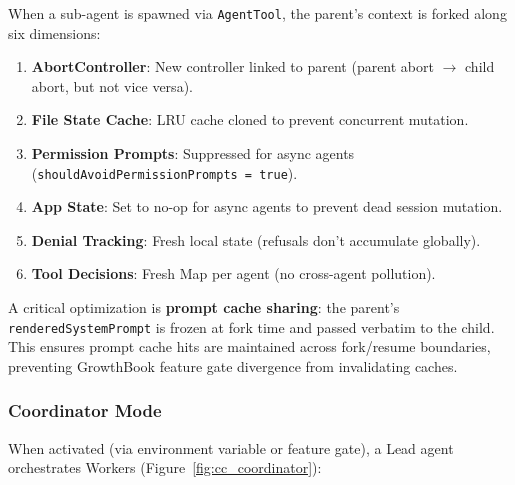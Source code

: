 \documentclass[11pt,a4paper]{article}
\begin{document}
When a sub-agent is spawned via \texttt{AgentTool}, the parent's context is forked along six dimensions:

\begin{enumerate}[itemsep=1pt]
  \item \textbf{AbortController}: New controller linked to parent (parent abort $\to$ child abort, but not vice versa).
  \item \textbf{File State Cache}: LRU cache cloned to prevent concurrent mutation.
  \item \textbf{Permission Prompts}: Suppressed for async agents (\texttt{shouldAvoidPermissionPrompts = true}).
  \item \textbf{App State}: Set to no-op for async agents to prevent dead session mutation.
  \item \textbf{Denial Tracking}: Fresh local state (refusals don't accumulate globally).
  \item \textbf{Tool Decisions}: Fresh Map per agent (no cross-agent pollution).
\end{enumerate}

A critical optimization is \textbf{prompt cache sharing}: the parent's \texttt{renderedSystemPrompt} is frozen at fork time and passed verbatim to the child.
This ensures prompt cache hits are maintained across fork/resume boundaries, preventing GrowthBook feature gate divergence from invalidating caches.

\subsubsection{Coordinator Mode}

When activated (via environment variable or feature gate), a Lead agent orchestrates Workers (Figure~\ref{fig:cc_coordinator}):
\end{document}
